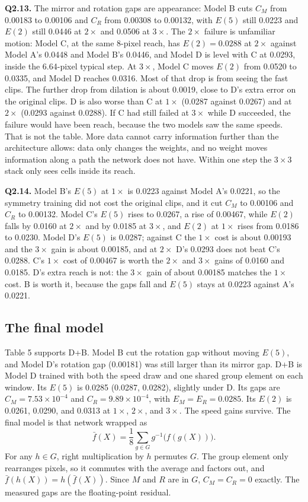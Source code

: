 \documentclass[11pt,a4paper]{article}
\begin{document}
\textbf{Q2.13.} The mirror and rotation gaps are appearance: Model B cuts \(C_M\) from 0.00183 to 0.00106 and \(C_R\) from 0.00308 to 0.00132, with \(E(5)\) still 0.0223 and \(E(2)\) still 0.0446 at \(2\times\) and 0.0506 at \(3\times\). The \(2\times\) failure is unfamiliar motion: Model C, at the same 8-pixel reach, has \(E(2)=0.0288\) at \(2\times\) against Model A's 0.0448 and Model B's 0.0446, and Model D is level with C at 0.0293, inside the 6.64-pixel typical step. At \(3\times\), Model C moves \(E(2)\) from 0.0520 to 0.0335, and Model D reaches 0.0316. Most of that drop is from seeing the fast clips. The further drop from dilation is about 0.0019, close to D's extra error on the original clips. D is also worse than C at \(1\times\) (0.0287 against 0.0267) and at \(2\times\) (0.0293 against 0.0288). If C had still failed at \(3\times\) while D succeeded, the failure would have been reach, because the two models saw the same speeds. That is not the table. More data cannot carry information further than the architecture allows: data only changes the weights, and no weight moves information along a path the network does not have. Within one step the \(3\times 3\) stack only sees cells inside its reach.

\textbf{Q2.14.} Model B's \(E(5)\) at \(1\times\) is 0.0223 against Model A's 0.0221, so the symmetry training did not cost the original clips, and it cut \(C_M\) to 0.00106 and \(C_R\) to 0.00132. Model C's \(E(5)\) rises to 0.0267, a rise of 0.00467, while \(E(2)\) falls by 0.0160 at \(2\times\) and by 0.0185 at \(3\times\), and \(E(2)\) at \(1\times\) rises from 0.0186 to 0.0230. Model D's \(E(5)\) is 0.0287; against C the \(1\times\) cost is about 0.00193 and the \(3\times\) gain is about 0.00185, and at \(2\times\) D's 0.0293 does not beat C's 0.0288. C's \(1\times\) cost of 0.00467 is worth the \(2\times\) and \(3\times\) gains of 0.0160 and 0.0185. D's extra reach is not: the \(3\times\) gain of about 0.00185 matches the \(1\times\) cost. B is worth it, because the gaps fall and \(E(5)\) stays at 0.0223 against A's 0.0221.

\subsection{The final model}

Table 5 supports D+B. Model B cut the rotation gap without moving \(E(5)\), and Model D's rotation gap (0.00181) was still larger than its mirror gap. D+B is Model D trained with both the speed draw and one shared group element on each window. Its \(E(5)\) is 0.0285 (0.0287, 0.0282), slightly under D. Its gaps are \(C_M=7.53\times10^{-4}\) and \(C_R=9.89\times10^{-4}\), with \(E_M=E_R=0.0285\). Its \(E(2)\) is 0.0261, 0.0290, and 0.0313 at \(1\times\), \(2\times\), and \(3\times\). The speed gains survive. The final model is that network wrapped as
\[
\bar f(X)=\frac{1}{8}\sum_{g\in G} g^{-1}\big(f(g(X))\big).
\]
For any \(h\in G\), right multiplication by \(h\) permutes \(G\). The group element only rearranges pixels, so it commutes with the average and factors out, and \(\bar f(h(X))=h(\bar f(X))\). Since \(M\) and \(R\) are in \(G\), \(C_M=C_R=0\) exactly. The measured gaps are the floating-point residual.
\end{document}
